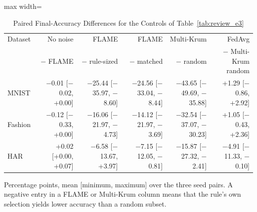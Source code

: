\begin{table}[!tp]
\centering\footnotesize
\setlength{\tabcolsep}{4pt}
\caption{Paired Final-Accuracy Differences for the Controls of Table~\ref{tab:review_e3}}\label{tab:review_e4}
\begin{adjustbox}{max width=\textwidth}
\begin{tabular}{lrrrrr}
\toprule
Dataset & No noise & FLAME & FLAME & Multi-Krum & FedAvg \\
 & $-$ FLAME & $-$ rule-sized & $-$ matched & $-$ random & $-$ Multi-Krum random \\
\midrule
MNIST & $-$0.01 [$-$0.02, +0.00] & $-$25.44 [$-$35.97, $-$8.60] & $-$24.56 [$-$33.04, $-$8.44] & $-$43.65 [$-$49.69, $-$35.88] & +1.29 [$-$0.86, +2.92] \\
Fashion & $-$0.12 [$-$0.33, +0.00] & $-$16.06 [$-$21.97, $-$4.73] & $-$14.12 [$-$21.97, $-$3.69] & $-$32.54 [$-$37.07, $-$30.23] & +1.05 [$-$0.43, +2.36] \\
HAR & +0.02 [+0.00, +0.07] & $-$6.58 [$-$13.67, +3.97] & $-$7.15 [$-$12.05, $-$0.81] & $-$15.87 [$-$27.32, $-$2.41] & $-$4.91 [$-$11.33, $-$0.10] \\
\bottomrule
\end{tabular}
\end{adjustbox}

\par\vspace{3pt}\parbox{\linewidth}{\footnotesize Percentage points, mean [minimum, maximum] over the three seed pairs. A negative entry in a FLAME or Multi-Krum column means that the rule's own selection yields lower accuracy than a random subset.}
\end{table}
